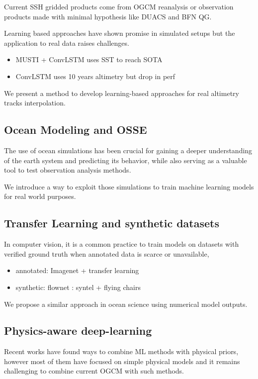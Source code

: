 \documentclass[draft]{agujournal2019}
\begin{document}
Current SSH gridded products come from OGCM reanalysis or observation products made with minimal hypothesis like DUACS and BFN QG.

Learning based approaches have shown promise in simulated setups but the application to real data raises challenges.

\begin{itemize}
    \item MUSTI + ConvLSTM uses SST to reach SOTA
    \item ConvLSTM uses 10 years altimetry but drop in perf
\end{itemize}

We present a method to develop learning-based approaches for real altimetry tracks interpolation.

\subsection{Ocean Modeling and OSSE}
The use of ocean simulations has been crucial for gaining a deeper understanding of the earth system and predicting its behavior, while also serving as a valuable tool to test observation analysis methods. 

We introduce a  way to exploit those simulations to train machine learning models for real world purposes. 

\subsection{Transfer Learning and synthetic datasets}
In computer vision, it is a common practice to train models on datasets with verified ground truth when annotated data is scarce or unavailable,

\begin{itemize}
    \item annotated: Imagenet + transfer learning
    \item synthetic: flownet : syntel + flying chairs
\end{itemize}

We propose a similar approach in ocean science using numerical model outputs.

\subsection{Physics-aware deep-learning}
Recent works have found ways to combine ML methods with physical priors, however most of them have focused on simple physical models and it remains challenging to combine current OGCM with such methods.
\end{document}
